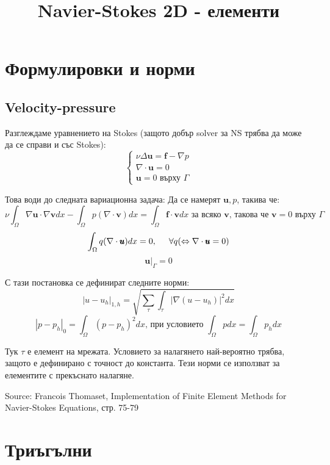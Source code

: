 \documentclass[fleqn,12pt]{article}
\title{Navier-Stokes 2D - елементи}
\begin{document}
    
\maketitle

\tableofcontents
\pagebreak

\section{Формулировки и норми}
\subsection{Velocity-pressure}

Разглеждаме уравнението на Stokes (защото добър solver за NS трябва да може да се справи и със Stokes):
\[ \begin{cases}
    \nu \Delta \pmb{u} = \pmb{f} - \nabla p \\
    \nabla \cdot \pmb{u} = 0 \\
    \pmb{u} = 0 \text{ върху } \Gamma
\end{cases} \]

Това води до следната вариационна задача: Да се намерят $\pmb{u}, p$, такива че:
\[ \nu \int_\Omega \nabla \pmb{u} \cdot \nabla \pmb{v} dx - \int_\Omega p (\nabla \cdot \pmb{v}) dx = \int_\Omega \pmb{f} \cdot \pmb{v} dx \text{ за всяко } \pmb{v} \text{, такова че } \pmb{v} = 0 \text{ върху } \Gamma \]
\[ \int_\Omega q (\nabla \cdot \pmb{u}) dx = 0, \hspace{5mm} \forall q (\Leftrightarrow \nabla \cdot \pmb{u} = 0) \]
\[ \pmb{u}|_{\Gamma} = 0 \]

С тази постановка се дефинират следните норми:
\[ |u - u_h|_{1,h} = \sqrt{\sum_\tau \int_\tau |\nabla(u-u_h)|^2 dx } \]
\[ |p - p_h|_0 = \int_\Omega (p-p_h)^2 dx \text{, при условието } \int_\Omega p dx = \int_\Omega p_h dx   \]

Тук $\tau$ е елемент на мрежата. Условието за налагянето най-вероятно трябва, защото е дефинирано с точност до константа.
Тези норми се използват за елементите с прекъснато налагяне.

Source: Francois Thomaset, Implementation of Finite Element Methods for Navier-Stokes Equations, стр. 75-79

\section{Триъгълни}
\end{document}
